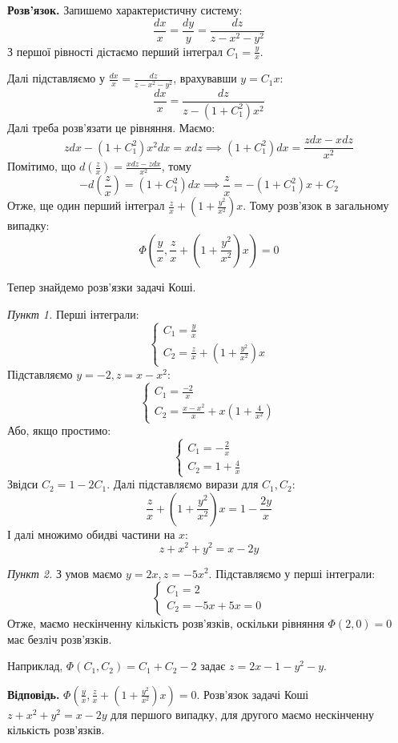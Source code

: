 \documentclass[14pt]{extarticle}
\begin{document}
\textbf{Розв'язок.} Запишемо характеристичну систему:
\[
\frac{dx}{x} = \frac{dy}{y} = \frac{dz}{z-x^2-y^2}
\]
З першої рівності дістаємо перший інтеграл $C_1=\frac{y}{x}$.

Далі підставляємо у $\frac{dx}{x}=\frac{dz}{z-x^2-y^2}$, врахувавши $y=C_1x$:
\[
\frac{dx}{x} = \frac{dz}{z-(1+C_1^2)x^2}
\]
Далі треба розв'язати це рівняння. Маємо:
\[
zdx - (1+C_1^2)x^2dx = xdz \implies (1+C_1^2)dx = \frac{zdx - xdz}{x^2}
\]
Помітимо, що $d\left(\frac{z}{x}\right) = \frac{xdz-zdx}{x^2}$, тому
\[
-d\left(\frac{z}{x}\right) = (1+C_1^2)dx \implies \frac{z}{x} = -(1+C_1^2)x + C_2
\]
Отже, ще один перший інтеграл $\frac{z}{x} + (1+\frac{y^2}{x^2})x$. Тому розв'язок в загальному випадку:
\[
\Phi\left(\frac{y}{x},\frac{z}{x}+\left(1+\frac{y^2}{x^2}\right)x\right) = 0
\]

Тепер знайдемо розв'язки задачі Коші.

\textit{Пункт 1.} Перші інтеграли:
\[
\begin{cases}
    C_1 = \frac{y}{x} \\
    C_2 = \frac{z}{x} + \left(1+\frac{y^2}{x^2}\right) x
\end{cases}
\]
Підставляємо $y=-2,z=x-x^2$:
\[
\begin{cases}
    C_1 = \frac{-2}{x} \\
    C_2 = \frac{x-x^2}{x} + x\left(1 + \frac{4}{x^2}\right)
\end{cases}
\]
Або, якщо простимо:
\[
\begin{cases}
    C_1 = -\frac{2}{x} \\
    C_2 = 1 + \frac{4}{x}
\end{cases}
\]
Звідси $C_2 = 1-2C_1$. Далі підставляємо вирази для $C_1,C_2$:
\[
\frac{z}{x} + \left(1+\frac{y^2}{x^2}\right)x = 1 - \frac{2y}{x}
\]
І далі множимо обидві частини на $x$:
\[
z + x^2 + y^2 = x-2y
\]

\textit{Пункт 2.} З умов маємо $y=2x, z=-5x^2$. Підставляємо у перші інтеграли:
\[
\begin{cases}
    C_1 = 2 \\
    C_2 = -5x + 5x = 0
\end{cases}
\]
Отже, маємо нескінченну кількість розв'язків, оскільки рівняння $\Phi(2,0)=0$ має безліч розв'язків. 

Наприклад, $\Phi(C_1,C_2)=C_1+C_2-2$ задає $z=2x-1-y^2-y$.

\textbf{Відповідь.} $\Phi\left(\frac{y}{x},\frac{z}{x}+\left(1+\frac{y^2}{x^2}\right)x\right) = 0$. Розв'язок задачі Коші $z+x^2+y^2=x-2y$ для першого випадку, для другого маємо нескінченну кількість розв'язків.
\end{document}
